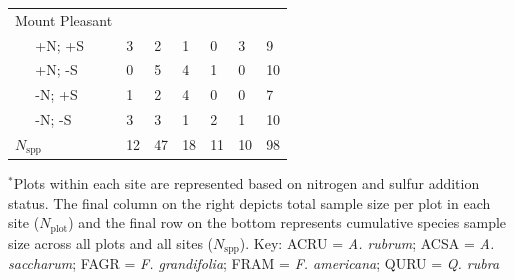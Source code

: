 \begin{table}[h!]
{\begin{tabular}{p{0.5cm}p{2cm}p{1cm}p{1cm}p{1cm}p{1cm}p{1cm}p{1cm}}
        \multicolumn{2}{l}{Mount Pleasant}  &    &    &    &    &    &    \\
                    & +N; +S                & 3  & 2  & 1  & 0  & 3  & 9  \\
                    & +N; -S                & 0  & 5  & 4  & 1  & 0  & 10 \\
                    & -N; +S                & 1  & 2  & 4  & 0  & 0  & 7  \\
                    & -N; -S                & 3  & 3  & 1  & 2  & 1  & 10 \\
      \hline
      \multicolumn{2}{l}{$N_\mathrm{spp}$}  & 12 & 47 & 18 & 11 & 10 & 98
      \end{tabular}%
      }
      \end{table}
      \begin{singlespace}
        \noindent $^*$Plots within each site are represented based on nitrogen and sulfur addition status. The final column on the right depicts total sample size per plot in each site ($N_\mathrm{plot}$) and the final row on the bottom represents cumulative species sample size across all plots and all sites ($N_\mathrm{spp}$). Key: ACRU = \textit{A. rubrum}; ACSA = \textit{A. saccharum}; FAGR = \textit{F. grandifolia}; FRAM = \textit{F. americana}; QURU = \textit{Q. rubra}
      \end{singlespace}
    \clearpage

